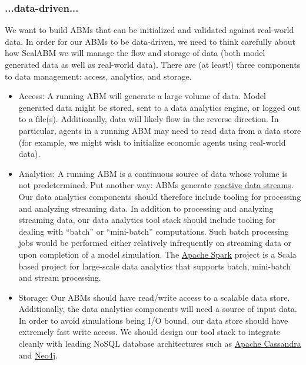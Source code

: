 \documentclass[11pt]{amsart}
\begin{document}
\subsubsection{...data-driven...}
We want to build ABMs that can be initialized and validated against real-world data. In order for our ABMs to be data-driven, we need to think carefully about how ScalABM we will manage the flow and storage of data (both model generated data as well as real-world data). There are (at least!) three components to data management: access, analytics, and storage.
\begin{itemize}
    \item Access: A running ABM will generate a large volume of data. Model generated data might be stored, sent to a data analytics engine, or logged out to a file(s). Additionally, data will likely flow in the reverse direction.  In particular, agents in a running ABM may need to read data from a data store (for example, we might wish to initialize economic agents using real-world data).
    \item Analytics: A running ABM is a continuous source of data whose volume is not predetermined. Put another way: ABMs generate \href{http://www.reactive-streams.org/}{reactive data streams}.  Our data analytics components should therefore include tooling for processing and analyzing streaming data. In addition to processing and analyzing streaming data, our data analytics tool stack should include tooling for dealing with ``batch'' or ``mini-batch'' computations. Such batch processing jobs would be performed either relatively infrequently on streaming data or upon completion of a model simulation. The \href{http://spark.apache.org/}{Apache Spark} project is a Scala based project for large-scale data analytics that supports batch, mini-batch and stream processing. 
    \item Storage: Our ABMs should have read/write access to a scalable data store. Additionally, the data analytics components will need a source of input data. In order to avoid simulations being I/O bound, our data store should have extremely fast write access. We should design our tool stack to integrate cleanly with leading NoSQL database architectures such as \href{http://cassandra.apache.org/}{Apache Cassandra} and \href{http://neo4j.com/}{Neo4j}.
\end{itemize}
\end{document}
